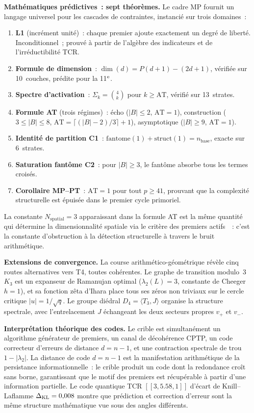 \documentclass[12pt,a4paper]{article}
\begin{document}
\textbf{Mathématiques prédictives~: sept théorèmes.}
Le cadre MP fournit un langage universel pour les cascades de
contraintes, instancié sur trois domaines~:
\begin{enumerate}[nosep]
\item \textbf{L1} (incrément unité)~: chaque premier ajoute
  exactement un degré de liberté. Inconditionnel~; prouvé à partir
  de l'algèbre des indicateurs et de l'irréductibilité TCR.
\item \textbf{Formule de dimension}~: $\dim(d) = P(d{+}1) - (2d{+}1)$,
  vérifiée sur 10~couches, prédite pour la 11$^{\rm e}$.
\item \textbf{Spectre d'activation}~: $\Sigma_k = \binom{4}{k}$ pour
  $k \geq \mathrm{AT}$, vérifié sur 13~strates.
\item \textbf{Formule AT} (trois régimes)~: écho ($|B| \leq 2$,
  $\mathrm{AT} = 1$), construction ($3 \leq |B| \leq 8$,
  $\mathrm{AT} = \lceil(|B|-2)/3\rceil + 1$), asymptotique
  ($|B| \geq 9$, $\mathrm{AT} = 1$).
\item \textbf{Identité de partition C1}~: $\mathrm{fantome}(1)
  + \mathrm{struct}(1) = n_{\mathrm{base}}$, exacte sur 6~strates.
\item \textbf{Saturation fantôme C2}~: pour $|B| \geq 3$, le fantôme
  absorbe tous les termes croisés.
\item \textbf{Corollaire MP--PT}~: $\mathrm{AT} = 1$ pour tout
  $p \geq 41$, prouvant que la complexité structurelle est épuisée
  dans le premier cycle primoriel.
\end{enumerate}
La constante $N_{\mathrm{spatial}} = 3$ apparaissant dans la formule
AT est la même quantité qui détermine la dimensionnalité spatiale
via le critère des premiers actifs~\cite{companion_M2}~: c'est la
constante d'obstruction à la détection structurelle à travers le
bruit arithmétique.

\textbf{Extensions de convergence.}
La course arithmético-géométrique révèle cinq routes alternatives
vers T4, toutes cohérentes. Le graphe de transition modulo~3 $K_3$
est un expanseur de Ramanujan optimal ($\lambda_2(L) = 3$, constante
de Cheeger $h = 1$), et sa fonction zêta d'Ihara place tous ses
zéros non triviaux sur le cercle critique $|u| = 1/\sqrt{q}$. Le
groupe diédral $D_4 = \langle T_3, J \rangle$ organise la structure
spectrale, avec l'entrelacement $J$ échangeant les deux secteurs
propres $v_+$ et $v_-$.

\textbf{Interprétation théorique des codes.}
Le crible est simultanément un algorithme générateur de premiers, un
canal de décohérence CPTP, un code correcteur d'erreurs de distance
$d = n - 1$, et une contraction spectrale de trou $1 - |\lambda_2|$.
La distance de code $d = n - 1$ est la manifestation arithmétique de
la persistance informationnelle~: le crible produit un code dont la
redondance croît sans borne, garantissant que le motif des premiers
est récupérable à partir d'une information partielle. Le code
quantique TCR $[[3, 5.58, 1]]$ d'écart de Knill--Laflamme
$\Delta_{\rm KL} = 0{,}008$ montre que prédiction et correction
d'erreur sont la même structure mathématique vue sous des angles
différents.
\end{document}
